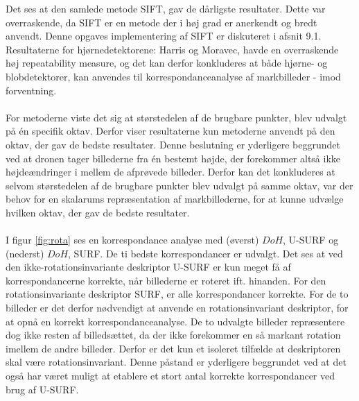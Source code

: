 \noindent
Det ses at den samlede metode SIFT, gav de dårligste resultater. Dette var overraskende, da SIFT er en metode der i høj grad er anerkendt og bredt anvendt. Denne opgaves implementering af SIFT er diskuteret i afsnit 9.1. Resultaterne for hjørnedetektorene: Harris og Moravec, havde en overraskende høj repeatability measure, og det kan derfor konkluderes at både hjørne- og blobdetektorer, kan anvendes til korrespondanceanalyse af markbilleder - imod forventning.
\\ \\
For metoderne viste det sig at størstedelen af de brugbare punkter, blev udvalgt på én specifik oktav. Derfor viser resultaterne kun metoderne anvendt på den oktav, der gav de bedste resultater. Denne beslutning er yderligere beggrundet ved at dronen tager billederne fra én bestemt højde, der forekommer altså ikke højdeændringer i mellem de afprøvede billeder. Derfor kan det konkluderes at selvom størstedelen af de brugbare punkter blev udvalgt på samme oktav, var der behov for en skalarums repræsentation af markbillederne, for at kunne udvælge hvilken oktav, der gav de bedste resultater.
\\ \\
I figur \ref{fig:rota} ses en korrespondance analyse med (øverst) $DoH$, U-SURF og (nederst) $DoH$, SURF. De ti bedste korrespondancer er udvalgt. Det ses at ved den ikke-rotationsinvariante deskriptor U-SURF er kun meget få af korrespondancerne korrekte, når billederne er roteret ift. hinanden. For den rotationsinvariante deskriptor SURF, er alle korrespondancer korrekte. For de to billeder er det derfor nødvendigt at anvende en rotationsinvariant deskriptor, for at opnå en korrekt korrespondanceanalyse. De to udvalgte billeder repræsentere dog ikke resten af billedsættet, da der ikke forekommer en så markant rotation imellem de andre billeder. Derfor er det kun et isoleret tilfælde at deskriptoren skal være rotationsinvariant. Denne påstand er yderligere beggrundet ved at det også har været muligt at etablere et stort antal korrekte korrespondancer ved brug af U-SURF.
